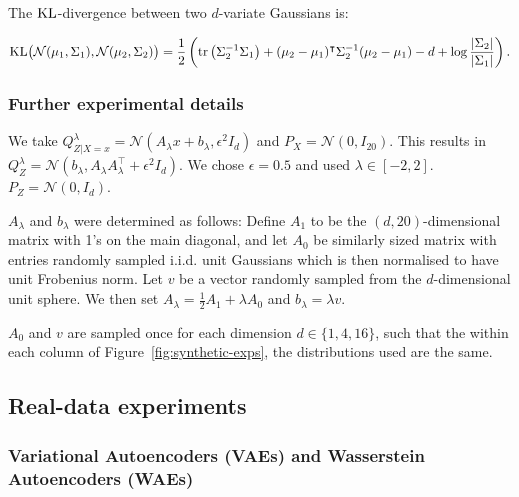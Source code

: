 The $\mathrm{KL}$-divergence between two $d$-variate Gaussians is:
 
\begin{lemma}
\begin{align*}
\mathrm{KL}\bigl( \mathcal{N}(\mu_1, \Sigma_1), 
\mathcal{N}(\mu_2, \Sigma_2)\bigr) = \frac{1}{2} \left( \text{tr}\left(\Sigma_2^{-1} \Sigma_1\right)
+ (\mu_2  - \mu_1)^\intercal \Sigma_2^{-1}(\mu_2 - \mu_1) - d + \log\frac{|\Sigma_2|}{|\Sigma_1|}
\right).
\end{align*}
\end{lemma}



\subsubsection{Further experimental details}

We take $Q^\lambda_{Z|X=x} = \mathcal{N}\left(A_\lambda x + b_\lambda, \epsilon^2 I_d \right)$ and $P_X = \mathcal{N}\left(0, I_{20} \right)$.
This results in $Q^\lambda_Z = \mathcal{N}\left(b_\lambda,  A_\lambda A_\lambda^\intercal + \epsilon^2 I_d \right)$. We chose $\epsilon=0.5$ and used $\lambda \in [-2,2]$. $P_Z = \mathcal{N}(0, I_d)$.

$A_\lambda$ and $b_\lambda$ were determined as follows:
Define $A_1$ to be the $(d, 20)$-dimensional matrix with 1's on the main diagonal, and let $A_0$ be similarly sized matrix with entries randomly sampled i.i.d.\: unit Gaussians which is then normalised to have unit Frobenius norm. 
Let $v$ be a vector randomly sampled from the $d$-dimensional unit sphere.
We then set
$A_\lambda=\frac{1}{2} A_1 + \lambda A_0$ and $b_\lambda= \lambda v$.

$A_0$ and $v$ are sampled once for each dimension $d{\in}\{1,4,16\}$, such that the within each column of Figure~\ref{fig:synthetic-exps}, the distributions used are the same.







\subsection{Real-data experiments}\label{appendix:real-data-experiments-additional}

\subsubsection{Variational Autoencoders (VAEs) and Wasserstein Autoencoders (WAEs)}\label{appendix:intro-vae-wae}

